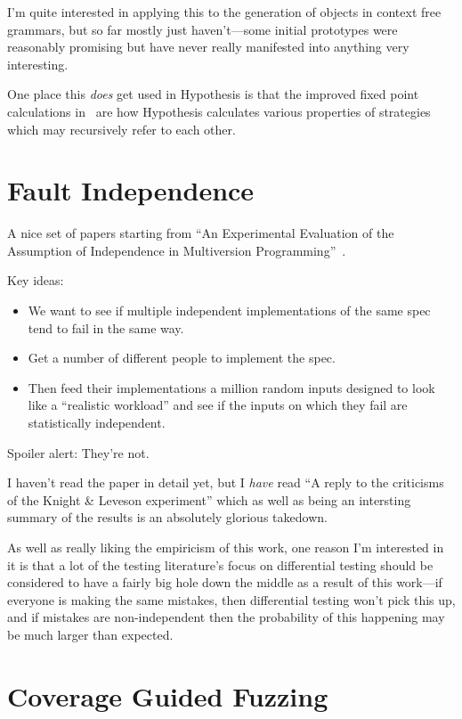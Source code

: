 \documentclass[a4paper]{book}
\begin{document}
I'm quite interested in applying this to the generation of objects in context free grammars,
but so far mostly just haven't---some
initial prototypes were reasonably promising but have never really manifested into anything very interesting.

One place this \emph{does} get used in Hypothesis is that the improved fixed point calculations in~\cite{DBLP:conf/pldi/0001HM16} are how Hypothesis calculates various properties of strategies which may recursively refer to each other.

\section{Fault Independence}

A nice set of papers starting from ``An Experimental Evaluation of the Assumption of Independence in Multiversion Programming''~\cite{DBLP:journals/tse/KnightL86}.

Key ideas:

\begin{itemize}
\item We want to see if multiple independent implementations of the same spec tend to fail in the same way.
\item Get a number of different people to implement the spec.
\item Then feed their implementations a million random inputs designed to look like a ``realistic workload'' and see if the inputs on which they fail are statistically independent.
\end{itemize}

Spoiler alert: They're not.

I haven't read the paper in detail yet,
but I \emph{have} read ``A reply to the criticisms of the Knight \& Leveson experiment''\cite{knight1990reply} which as well as being an intersting summary of the results is an absolutely glorious takedown.

As well as really liking the empiricism of this work,
one reason I'm interested in it is that a lot of the testing literature's focus on differential testing should be considered to have a fairly big hole down the middle as a result of this work---if everyone is making the same mistakes,
then differential testing won't pick this up,
and if mistakes are non-independent then the probability of this happening may be much larger than expected.

\section{Coverage Guided Fuzzing}
\end{document}
